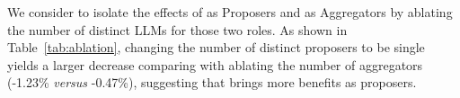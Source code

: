 



    

We consider to isolate the effects of \mosa{} as Proposers and \mosa{} as Aggregators by ablating the number of distinct LLMs for those two roles.
As shown in Table~\ref{tab:ablation}, changing the number of distinct proposers to be single yields a larger decrease comparing with ablating the number of aggregators (-1.23\% \emph{versus} -0.47\%), suggesting that \mosa{} brings more benefits as proposers.

